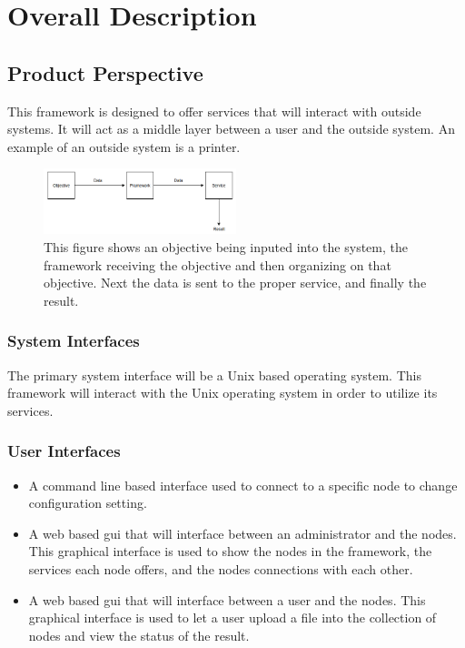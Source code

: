 \documentclass[draftclsnofoot, onecolumn, compsoc, 10pt]{IEEEtran}
\begin{document}
\section{Overall Description}
\subsection{Product Perspective}
This framework is designed to offer services that will interact with outside systems. It will act as a middle layer between a user and the outside system. An example of an outside system is a printer. 
\begin{figure}[!htb]
  \caption{This figure shows an objective being inputed into the system, the framework receiving the objective and then organizing on that objective. Next the data is sent to the proper service, and finally the result.}
  \centering
    \includegraphics[width=0.5\textwidth]{img_2}
\end{figure}

\subsubsection{System Interfaces}
The primary system interface will be a Unix based operating system. This framework will interact with the Unix operating system in order to utilize its services. 

\subsubsection{User Interfaces}
\begin{itemize}
\item A command line based interface used to connect to a specific node to change configuration setting.\\
\item A web based gui that will interface between an administrator and the nodes. This graphical interface is used to show the nodes in the framework, the services each node offers, and the nodes connections with each other.\\ 
\item A web based gui that will interface between a user and the nodes. This graphical interface is used to let a user upload a file into the collection of nodes and view the status of the result.
\end{itemize}
\end{document}

